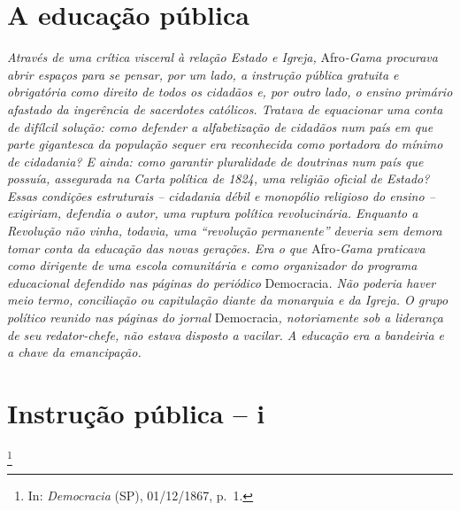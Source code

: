 \chapter{A educação pública}

\begin{didascalia}
\emph{Através de uma crítica visceral à relação Estado e Igreja,}
Afro\emph{-Gama procurava abrir espaços para se pensar, por um lado, a
instrução pública gratuita e obrigatória como direito de todos os
cidadãos e, por outro lado, o ensino primário afastado da ingerência de
sacerdotes católicos. Tratava de equacionar uma conta de difílcil
solução: como defender a alfabetização de cidadãos num país em que parte
gigantesca da população sequer era reconhecida como portadora do mínimo
de cidadania? E ainda: como garantir pluralidade de doutrinas num país
que possuía, assegurada na Carta política de 1824, uma religião oficial
de Estado? Essas condições estruturais -- cidadania débil e monopólio
religioso do ensino -- exigiriam, defendia o autor, uma ruptura política
revolucinária. Enquanto a Revolução não vinha, todavia, uma ``revolução
permanente'' deveria sem demora tomar conta da educação das novas
gerações. Era o que} Afro\emph{-Gama praticava como dirigente de uma
escola comunitária e como organizador do programa educacional defendido
nas páginas do periódico} Democracia\emph{. Não poderia haver meio
termo, conciliação ou capitulação diante da monarquia e da Igreja. O
grupo político reunido nas páginas do jornal} Democracia\emph{,
notoriamente sob a liderança de seu redator-chefe, não estava disposto a
vacilar. A educação era a bandeiria e a chave da emancipação.}
\end{didascalia}

\chapter{Instrução pública -- i}\footnote{In: \emph{Democracia} (SP),
  01/12/1867, p.~1.}

